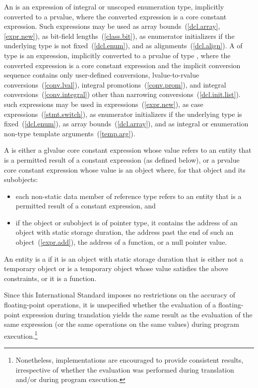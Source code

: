\pnum
An  is an expression of integral or
unscoped enumeration type, implicitly converted to a prvalue, where the converted expression is a core constant expression.
\enternote
Such expressions may be
used as array bounds~(\ref{dcl.array}, \ref{expr.new}),
as bit-field lengths~(\ref{class.bit}), as enumerator
initializers if the underlying type is not fixed~(\ref{dcl.enum}),
and as alignments~(\ref{dcl.align}).
\exitnote
A  of type  is an
expression, implicitly converted to a prvalue of type , where
the converted expression is a core constant expression and the
implicit conversion sequence contains only user-defined conversions, lvalue-to-rvalue
conversions~(\ref{conv.lval}), integral promotions~(\ref{conv.prom}), and
integral conversions~(\ref{conv.integral}) other than narrowing conversions~(\ref{dcl.init.list}).
\enternote
such expressions may be used in 
expressions~(\ref{expr.new}), as case expressions~(\ref{stmt.switch}),
as enumerator initializers if the underlying type is
fixed~(\ref{dcl.enum}), as array bounds~(\ref{dcl.array}), and
as integral or enumeration non-type template
arguments~(\ref{temp.arg}). 
\exitnote

\pnum
A  is either
a glvalue core constant expression whose value refers to
an entity that is a permitted result of a constant expression (as defined below), or
a prvalue core constant expression whose value is an object where, for that
object and its subobjects:

\begin{itemize}
  \item
  each non-static data member of reference type refers to
  an entity that is a permitted result of a constant expression, and

  \item
  if the object or subobject is of pointer type, it contains
  the address of an object with static storage duration,
  the address past the end of such an object~(\ref{expr.add}),
  the address of a function,
  or a null pointer value.
\end{itemize}
%
An entity is a  if it is an
object with static storage duration that is either not a temporary object or is
a temporary object whose value satisfies the above constraints, or it is a
function.

\pnum
\enternote Since this International Standard
imposes no restrictions on the accuracy of floating-point operations, it is unspecified whether the
evaluation of a floating-point expression during translation yields the same result as the
evaluation of the same expression (or the same operations on the same values) during program
execution.\footnote{Nonetheless, implementations are encouraged to provide consistent results,
irrespective of whether the evaluation was performed during translation and/or during program
execution.} \enterexample


